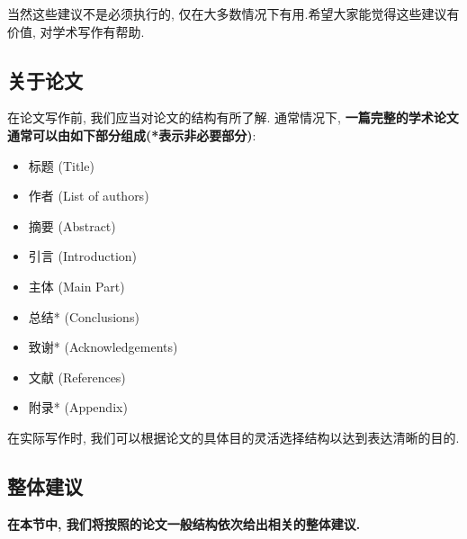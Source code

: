 \documentclass{booki}
\begin{document}
当然这些建议不是必须执行的, 仅在大多数情况下有用.希望大家能觉得这些建议有价值, 对学术写作有帮助.
\subsection{关于论文}
{在论文写作前, 我们应当对论文的结构有所了解. 通常情况下, \textbf{一篇完整的学术论文通常可以由如下部分组成(*表示非必要部分)}:}
{
\begin{itemize}
    \item 标题 (Title)
    \item 作者 (List of authors)
    \item 摘要 (Abstract)
    \item 引言 (Introduction)
    \item 主体 (Main Part)
    \item 总结* (Conclusions)
    \item 致谢* (Acknowledgements)
    \item 文献 (References)
    \item 附录* (Appendix)
\end{itemize}}
{在实际写作时, 我们可以根据论文的具体目的灵活选择结构以达到表达清晰的目的.}

\subsection{整体建议}
{\textbf{在本节中, 我们将按照的论文一般结构依次给出相关的整体建议.}}
\end{document}
